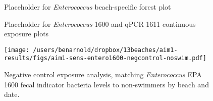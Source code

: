 \documentclass[11pt]{article}
\begin{document}
\clearpage
\begin{figure}[htbp]
\begin{center}
\begin{minipage}{\textwidth}
\caption{Placeholder for \textit{Enterococcus} beach-specific forest plot}
\label{fig:enteroforest}
\end{minipage}
\end{center}
\end{figure}


\clearpage
\begin{figure}[htbp]
\begin{center}
\begin{minipage}{\textwidth}
\caption{Placeholder for \textit{Enterococcus} 1600 and qPCR 1611 continuous exposure plots}
\label{fig:enterocontinuous}
\end{minipage}
\end{center}
\end{figure}


\clearpage
\begin{figure}[htbp]
\begin{center}
 \texttt{[image: /users/benarnold/dropbox/13beaches/aim1-results/figs/aim1-sens-entero1600-negcontrol-noswim.pdf]} 
\begin{minipage}{\textwidth}
\caption{Negative control exposure analysis, matching \textit{Enterococcus} EPA 1600 fecal indicator bacteria levels to non-swimmers by beach and date.}
\label{fig:negcontrol}
\end{minipage}
\end{center}
\end{figure}
\end{document}
